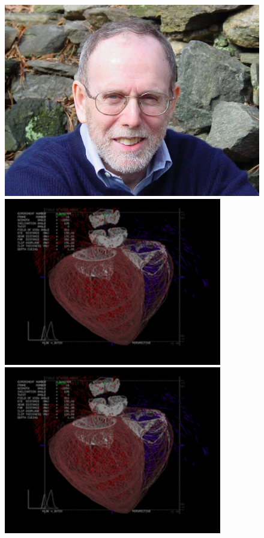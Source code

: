 \documentclass[a4paper,10pt]{article}
\begin{document}
\begin{figure}
\begin{center}
\includegraphics[scale=0.205]{figures/DSC01508_scale4.jpeg}
\hspace{0.1pc}
\includegraphics[scale=0.32]{figures/3D heart.png}\\
\includegraphics[scale=0.32]{figures/3D heart.png}

\end{center}
\end{figure}
\end{document}
